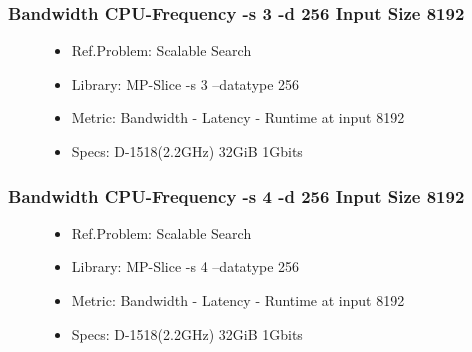 \begin{frame}
    \frametitle{Bandwidth CPU-Frequency -s 3 -d 256 Input Size 8192}

    \begin{figure}
        \begin{itemize}
            \item Ref.Problem: Scalable Search
            \item Library: MP-Slice -s 3 --datatype 256
            \item Metric: Bandwidth - Latency - Runtime at input 8192
            \item Specs: D-1518(2.2GHz) 32GiB 1Gbits
        \end{itemize}
    \end{figure}

\end{frame}


\begin{frame}
    \frametitle{Bandwidth CPU-Frequency -s 4 -d 256 Input Size 8192}

    \begin{figure}
        \begin{itemize}
            \item Ref.Problem: Scalable Search
            \item Library: MP-Slice -s 4 --datatype 256
            \item Metric: Bandwidth - Latency - Runtime at input 8192
            \item Specs: D-1518(2.2GHz) 32GiB 1Gbits
        \end{itemize}
    \end{figure}

\end{frame}

